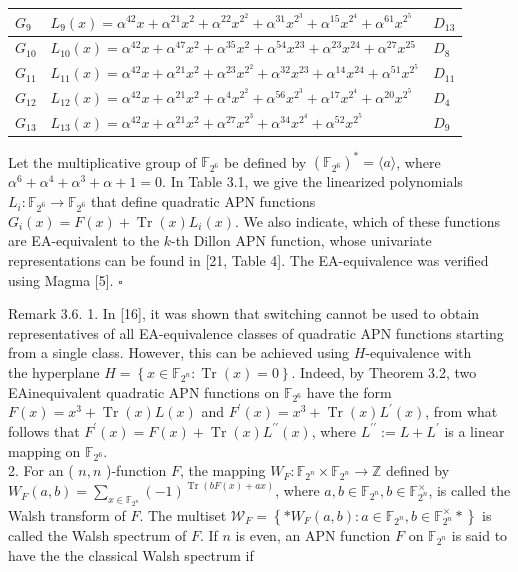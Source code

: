 \documentclass[10pt]{article}
\begin{document}
\begin{table}[h]
\begin{center}
\begin{tabular}{|l|l|l|}
\hline
$G_{9}$ & $L_{9}(x)=\alpha^{42} x+\alpha^{21} x^{2}+\alpha^{22} x^{2^{2}}+\alpha^{31} x^{2^{3}}+\alpha^{15} x^{2^{4}}+\alpha^{61} x^{2^{5}}$ & $D_{13}$ \\
\hline
$G_{10}$ & $L_{10}(x)=\alpha^{42} x+\alpha^{47} x^{2}+\alpha^{35} x^{2}+\alpha^{54} x^{23}+\alpha^{23} x^{24}+\alpha^{27} x^{25}$ & $D_{8}$ \\
\hline
$G_{11}$ & $L_{11}(x)=\alpha^{42} x+\alpha^{21} x^{2}+\alpha^{23} x^{2^{2}}+\alpha^{32} x^{23}+\alpha^{14} x^{24}+\alpha^{51} x^{2^{5}}$ & $D_{11}$ \\
\hline
$G_{12}$ & $L_{12}(x)=\alpha^{42} x+\alpha^{21} x^{2}+\alpha^{4} x^{2^{2}}+\alpha^{56} x^{2^{3}}+\alpha^{17} x^{2^{4}}+\alpha^{20} x^{2^{5}}$ & $D_{4}$ \\
\hline
$G_{13}$ & $L_{13}(x)=\alpha^{42} x+\alpha^{21} x^{2}+\alpha^{27} x^{2^{3}}+\alpha^{34} x^{2^{4}}+\alpha^{52} x^{2^{5}}$ & $D_{9}$ \\
\hline
\end{tabular}
\end{center}
\end{table}

Let the multiplicative group of $\mathbb{F}_{2^{6}}$ be defined by $\left(\mathbb{F}_{2^{6}}\right)^{*}=\langle a\rangle$, where $\alpha^{6}+\alpha^{4}+ \alpha^{3}+\alpha+1=0$. In Table 3.1, we give the linearized polynomials $L_{i}: \mathbb{F}_{2^{6}} \rightarrow \mathbb{F}_{2^{6}}$ that define quadratic APN functions $G_{i}(x)=F(x)+\operatorname{Tr}(x) L_{i}(x)$. We also indicate, which of these functions are EA-equivalent to the $k$-th Dillon APN function, whose univariate representations can be found in [21, Table 4]. The EA-equivalence was verified using Magma [5]. \(\square\)

Remark 3.6. 1. In [16], it was shown that switching cannot be used to obtain representatives of all EA-equivalence classes of quadratic APN functions starting from a single class. However, this can be achieved using $H$-equivalence with\\
the hyperplane $H=\left\{x \in \mathbb{F}_{2^{n}}: \operatorname{Tr}(x)=0\right\}$. Indeed, by Theorem 3.2, two EAinequivalent quadratic APN functions on $\mathbb{F}_{2^{6}}$ have the form $F(x)=x^{3}+\operatorname{Tr}(x) L(x)$ and $F^{\prime}(x)=x^{3}+\operatorname{Tr}(x) L^{\prime}(x)$, from what follows that $F^{\prime}(x)=F(x)+\operatorname{Tr}(x) L^{\prime \prime}(x)$, where $L^{\prime \prime}:=L+L^{\prime}$ is a linear mapping on $\mathbb{F}_{2^{6}}$.\\
2. For an ( $n, n$ )-function $F$, the mapping $W_{F}: \mathbb{F}_{2^{n}} \times \mathbb{F}_{2^{n}} \rightarrow \mathbb{Z}$ defined by $W_{F}(a, b)= \sum_{x \in \mathbb{F}_{2^{n}}}(-1)^{\operatorname{Tr}(b F(x)+a x)}$, where $a, b \in \mathbb{F}_{2^{n}}, b \in \mathbb{F}_{2^{n}}^{\times}$, is called the Walsh transform of $F$. The multiset $\mathcal{W}_{F}=\left\{* W_{F}(a, b): a \in \mathbb{F}_{2^{n}}, b \in \mathbb{F}_{2^{n}}^{\times} *\right\}$ is called the Walsh spectrum of $F$. If $n$ is even, an APN function $F$ on $\mathbb{F}_{2^{n}}$ is said to have the the classical Walsh spectrum if
\end{document}
